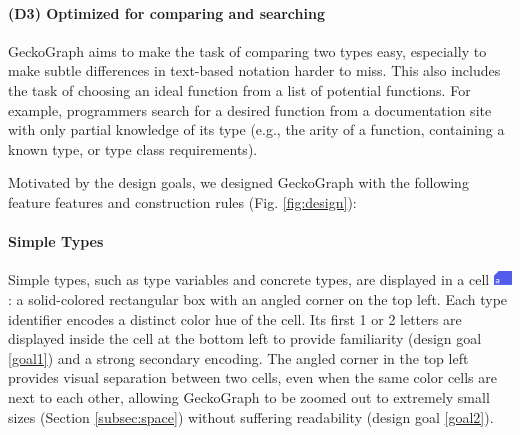 \documentclass[preprint,12pt]{elsarticle}
\begin{document}
\paragraph{\textbf{(D3) Optimized for comparing and searching}} \label{goal3} GeckoGraph aims to make the task of comparing two types easy, especially to make subtle differences in text-based notation harder to miss. This also includes the task of choosing an ideal function from a list of potential functions. For example, programmers search for a desired function from a documentation site with only partial knowledge of its type (e.g., the arity of a function, containing a known type, or type class requirements). 

Motivated by the design goals, we designed GeckoGraph with the following feature features and construction rules (Fig. \ref{fig:design}):

\paragraph{Simple Types} 
Simple types, such as type variables and concrete types, are displayed in a cell \includegraphics[height=1em]{figures/SimpleType}: a solid-colored rectangular box with an angled corner on the top left. Each type identifier encodes a distinct color hue of the cell. Its first 1 or 2 letters are displayed inside the cell at the bottom left to provide familiarity (design goal \ref{goal1}) and a strong secondary encoding. The angled corner in the top left provides visual separation between two cells, even when the same color cells are next to each other, allowing GeckoGraph to be zoomed out to extremely small sizes (Section \ref{subsec:space}) without suffering readability (design goal \ref{goal2}).
\end{document}
